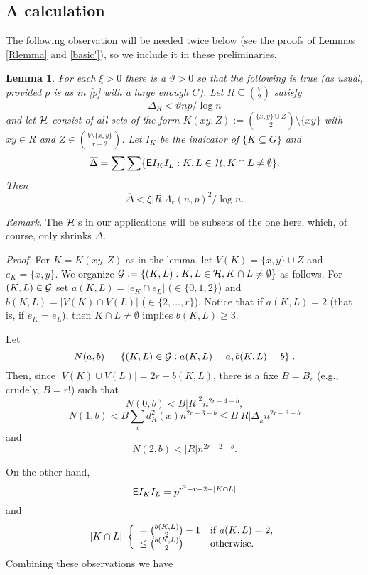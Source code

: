 \documentclass[letterpaper,11pt]{article}
\newtheorem{lemma}[thm]{Lemma}
\newcommand{\beq}[1]{\begin{equation}\label{#1}}
\newcommand{\enq}[0]{\end{equation}}
\newcommand{\mn}[0]{\medskip\noindent}
\newcommand{\sub}[0]{\subseteq}
\newcommand{\sm}[0]{\setminus}
\renewcommand{\dots}[0]{,\ldots,}
\newcommand{\ov}[0]{\overline}
\newcommand{\g}[0]{{\cal G}}
\newcommand{\h}[0]{{\cal H}}
\newcommand{\0}[0]{\emptyset}
\newcommand{\C}[2]{{{#1}\choose{{#2}}}}
\newcommand{\Cc}[0]{\tbinom}
\newcommand{\gD}[0]{\Delta }
\newcommand{\gL}[0]{\Lambda}
\newcommand{\vt}[0]{\vartheta}
\newcommand{\glr}[0]{\gL_r(n,p)}
\begin{document}
\subsection{A calculation}


The following observation will be needed
twice below
(see the proofs of Lemmas \ref{Rlemma} and \ref{basic'}), so
we include it in these preliminaries.












\begin{lemma}\label{newHlemma}
For each $\xi>0$ there is a $\vt>0$ so that the following is true
(as usual, provided $p$ is as in \eqref{p} with a large enough $C$).
Let $R\sub \C{V}{2}$ satisfy
\beq{Rdeg}
\gD_R < \vt np/\log n
\enq
and let $\h$ consist of all
sets of the form $K(xy,Z) := \C{\{x,y\}\cup Z}{2}\sm \{xy\}$
with $xy\in R$ and $Z\in \C{V\sm \{x,y\}}{r-2}$.
Let $I_K$ be the indicator of $\{K\sub G\}$
and
\beq{ovgD}
\ov{\gD}=\sum\sum \{\E I_KI_L:K,L\in \h, K\cap L\neq \0\}.
\enq
Then
\beq{RLdelta}
\ov{\gD} < \xi|R|\glr^2/\log n.
\enq
\end{lemma}

\mn
{\em Remark.}  The $\h$'s in our applications
will be subsets of the one here, which, of course, only
shrinks $\ov{\gD}$.



\mn
{\em Proof.}
For $K=K(xy,Z)$ as in the lemma, let $V(K) = \{x,y\}\cup Z$
and $e_K=\{x,y\}$.
%
We organize
$\g:=\{(K,L):K,L\in \h, K\cap L\neq \0\}$
as follows.
%
For $(K,L)\in \g$ set $a(K,L) = |e_K\cap e_L| $ ($\in \{0,1,2\}$)
and
$b(K,L)= |V(K)\cap V(L)|$
($\in \{2\dots r\}$).
Notice that if $a(K,L) = 2$ (that is, if $e_K=e_L$),
then $K\cap L\neq\0$ implies $b(K,L)\geq 3$.

%
Let
\[N(a,b)= |\{(K,L)\in \g:
a(K,L) =a, b(K,L) =b\}|.\]
%
Then, since $|V(K)\cup V(L)|= 2r-b(K,L)$,
there is a fixe $B=B_r$ (e.g., crudely, $B= r!$) such that
\[
N(0,b) < B|R|^2n^{2r-4-b},
\]
\[\mbox{$N(1,b) < B\sum_xd^2_R(x)n^{2r-3-b}\leq B|R|\gD_{_R} n^{2r-3-b}$}\]
and
\[N(2,b) < |R|n^{2r-2-b}.\]



\mn
On the other hand,
\[
{\sf E} I_KI_L = p^{r^2-r-2-|K\cap L|}
\]
and
\[
|K\cap L| ~\left\{\begin{array}{ll}
= \Cc{b(K,L)}{2}-1&\mbox{if $a(K,L)=2$,}\\
\leq \Cc{b(K,L)}{2}&\mbox{otherwise.}
\end{array}\right.
\]
Combining these observations we have
\end{document}
